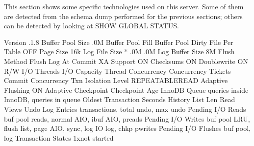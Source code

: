 \documentclass[letterpaper,10pt,english]{sphinxmanual}
\begin{document}
This section shows some specific technologies used on this server. Some of them
are detected from the schema dump performed for the previous sections; others
can be detected by looking at SHOW GLOBAL STATUS.

\begin{sphinxVerbatim}[commandchars=\\\{\}]
                  Version  .1.8
         Buffer Pool Size  .0M
         Buffer Pool Fill  \PYGZpc{}
        Buffer Pool Dirty  \PYGZpc{}
           File Per Table  OFF
                Page Size  16k
            Log File Size   * .0M  .0M
          Log Buffer Size  8M
             Flush Method 
      Flush Log At Commit  
               XA Support  ON
                Checksums  ON
              Doublewrite  ON
          R/W I/O Threads   
             I/O Capacity  
       Thread Concurrency  
      Concurrency Tickets  
       Commit Concurrency  
      Txn Isolation Level  REPEATABLE\PYGZhy{}READ
        Adaptive Flushing  ON
      Adaptive Checkpoint 
           Checkpoint Age  
             InnoDB Queue   queries inside InnoDB,  queries in queue
       Oldest Transaction   Seconds
         History List Len  
               Read Views  
         Undo Log Entries   transactions,  total undo,  max undo
        Pending I/O Reads   buf pool reads,  normal AIO,
                             ibuf AIO,  preads
       Pending I/O Writes   buf pool  LRU,  flush list,  page
                             AIO,  sync,  log IO  log,  chkp
                             pwrites
      Pending I/O Flushes   buf pool,  log
       Transaction States  1xnot started
\end{sphinxVerbatim}
\end{document}
